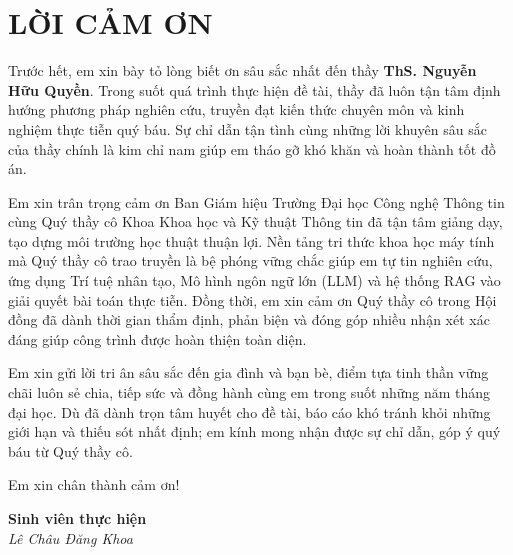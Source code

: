 \chapter*{LỜI CẢM ƠN}

Trước hết, em xin bày tỏ lòng biết ơn sâu sắc nhất đến thầy \textbf{ThS. Nguyễn Hữu Quyền}. Trong suốt quá trình thực hiện đề tài, thầy đã luôn tận tâm định hướng phương pháp nghiên cứu, truyền đạt kiến thức chuyên môn và kinh nghiệm thực tiễn quý báu. Sự chỉ dẫn tận tình cùng những lời khuyên sâu sắc của thầy chính là kim chỉ nam giúp em tháo gỡ khó khăn và hoàn thành tốt đồ án.

Em xin trân trọng cảm ơn Ban Giám hiệu Trường Đại học Công nghệ Thông tin cùng Quý thầy cô Khoa Khoa học và Kỹ thuật Thông tin đã tận tâm giảng dạy, tạo dựng môi trường học thuật thuận lợi. Nền tảng tri thức khoa học máy tính mà Quý thầy cô trao truyền là bệ phóng vững chắc giúp em tự tin nghiên cứu, ứng dụng Trí tuệ nhân tạo, Mô hình ngôn ngữ lớn (LLM) và hệ thống RAG vào giải quyết bài toán thực tiễn. Đồng thời, em xin cảm ơn Quý thầy cô trong Hội đồng đã dành thời gian thẩm định, phản biện và đóng góp nhiều nhận xét xác đáng giúp công trình được hoàn thiện toàn diện.

Em xin gửi lời tri ân sâu sắc đến gia đình và bạn bè, điểm tựa tinh thần vững chãi luôn sẻ chia, tiếp sức và đồng hành cùng em trong suốt những năm tháng đại học. Dù đã dành trọn tâm huyết cho đề tài, báo cáo khó tránh khỏi những giới hạn và thiếu sót nhất định; em kính mong nhận được sự chỉ dẫn, góp ý quý báu từ Quý thầy cô.

\vspace{0.3cm}
\noindent Em xin chân thành cảm ơn!
\vspace{0.3cm}

\begin{flushright}
\begin{minipage}{0.45\textwidth}
\centering
\textbf{Sinh viên thực hiện}
\\[5em]
\textit{Lê Châu Đăng Khoa}
\end{minipage}
\end{flushright}
